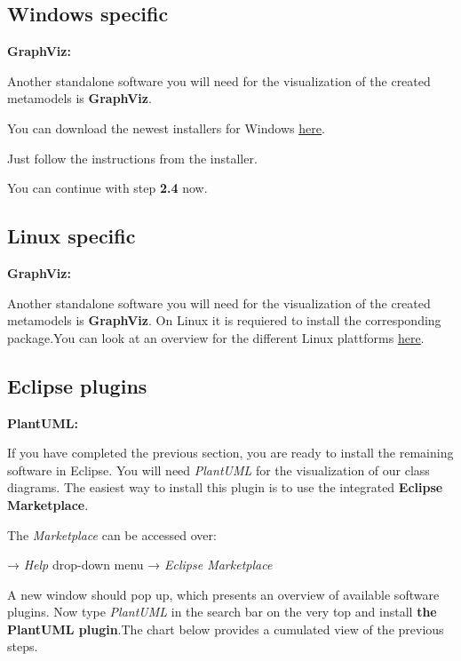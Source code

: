 \subsection{Windows specific}

\textbf{GraphViz:}

Another standalone software you will need for the visualization of the created metamodels is \textbf{GraphViz}.

You can download the newest installers for Windows \href{https://graphviz.org/download/}{\underline{here}}.

Just follow the instructions from the installer.\newline

You can continue with step \textbf{2.4} now.
\subsection{Linux specific}

\textbf{GraphViz:}

Another standalone software you will need for the visualization of the created metamodels is \textbf{GraphViz}. On Linux it is requiered to install the corresponding package.\newline You can look at an overview for the different Linux plattforms \href{https://graphviz.org/download/}{\underline{here}}.

\clearpage

\subsection{Eclipse plugins}

\textbf{PlantUML:}

If you have completed the previous section, you are ready to install the remaining software in Eclipse. You will need \textsf{\textit{PlantUML}} for the visualization of our class diagrams. The easiest way to install this plugin is to use the integrated \textbf{Eclipse Marketplace}.

The \textsf{\textit{Marketplace}} can be accessed over:\newline

\centering
→ \textsf{\textit{Help}} drop-down menu →
\textsf{\textit{Eclipse Marketplace}}\newline

\raggedright
A new window should pop up, which presents an overview of available software plugins. Now type \textit{\textsf{PlantUML}} in the search bar on the very top and install \textbf{the PlantUML plugin}.The chart below provides a cumulated view of the previous steps.\newline\newline

